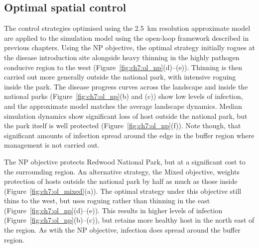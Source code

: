 \newpage
\subsection{Optimal spatial control}

The control strategies optimised using the \SI{2.5}{\km} resolution approximate model are applied to the simulation model using the open-loop framework described in previous chapters. Using the NP objective, the optimal strategy initially rogues at the disease introduction site alongside heavy thinning in the highly pathogen conducive region to the west (Figure~\ref{fig:ch7:ol_np}(d)--(e)). Thinning is then carried out more generally outside the national park, with intensive roguing inside the park. The disease progress curves across the landscape and inside the national parks (Figure~\ref{fig:ch7:ol_np}(b) and (c)) show low levels of infection, and the approximate model matches the average landscape dynamics. Median simulation dynamics show significant loss of host outside the national park, but the park itself is well protected (Figure~\ref{fig:ch7:ol_np}(f)). Note though, that significant amounts of infection spread around the edge in the buffer region where management is not carried out.

The NP objective protects Redwood National Park, but at a significant cost to the surrounding region. An alternative strategy, the Mixed objective, weights protection of hosts outside the national park by half as much as those inside (Figure~\ref{fig:ch7:ol_mixed}(a)). The optimal strategy under this objective still thins to the west, but uses roguing rather than thinning in the east (Figure~\ref{fig:ch7:ol_np}(d)--(e)). This results in higher levels of infection (Figure~\ref{fig:ch7:ol_np}(b)--(c)), but retains more healthy host in the north east of the region. As wtih the NP objective, infection does spread around the buffer region.

